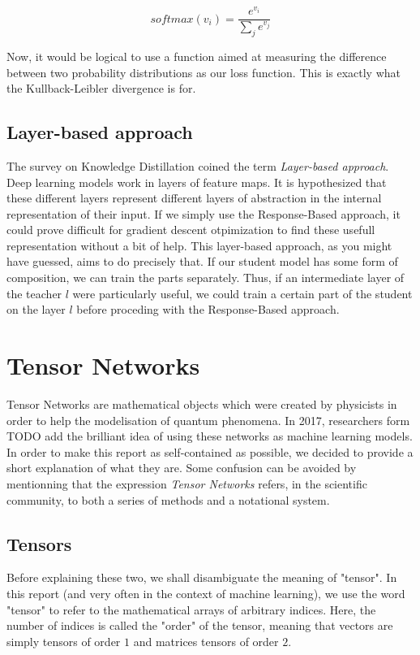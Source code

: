 \documentclass{article}
\theoremstyle{definition}
\theoremstyle{definition}
\begin{document}
\begin{equation}
    softmax(v_i) = \frac{e^{v_i}}{\sum_{j}{e^{v_j}}}
\end{equation}

Now, it would be logical to use a function aimed at measuring the difference between two probability distributions as our loss function. This is exactly what the Kullback-Leibler divergence is for.

\subsection{Layer-based approach}
The survey on Knowledge Distillation coined the term {\it Layer-based approach}.
Deep learning models work in layers of feature maps. It is hypothesized that
these different layers represent different layers of abstraction in the internal
representation of their input. If we simply use the Response-Based approach, it could prove difficult for gradient descent otpimization to find these usefull representation without a bit of help. This layer-based approach, as you might have guessed, aims to do precisely that. If our student model has some form of composition, we can train the parts separately. Thus, if an intermediate layer of the teacher $l$ were particularly useful, we could train a certain part of the student on the layer $l$ before proceding with the Response-Based approach.



\section{Tensor Networks}
Tensor Networks are mathematical objects which were created by physicists in order to help the modelisation of quantum phenomena.
In 2017, researchers form TODO add the brilliant idea of using these networks as machine learning models.
In order to make this report as self-contained as possible, we decided to provide a short explanation of what they are.
Some confusion can be avoided by mentionning that the expression \emph{Tensor Networks} refers, in the scientific community, to both a series of methods and a notational system.

\subsection{Tensors}
Before explaining these two, we shall disambiguate the meaning of "tensor". 
In this report (and very often in the context of machine learning), we use the word "tensor" to refer to the mathematical arrays of arbitrary indices. 
Here, the number of indices is called the "order" of the tensor, meaning that vectors are simply tensors of order $1$ and matrices tensors of order $2$. 
\end{document}
